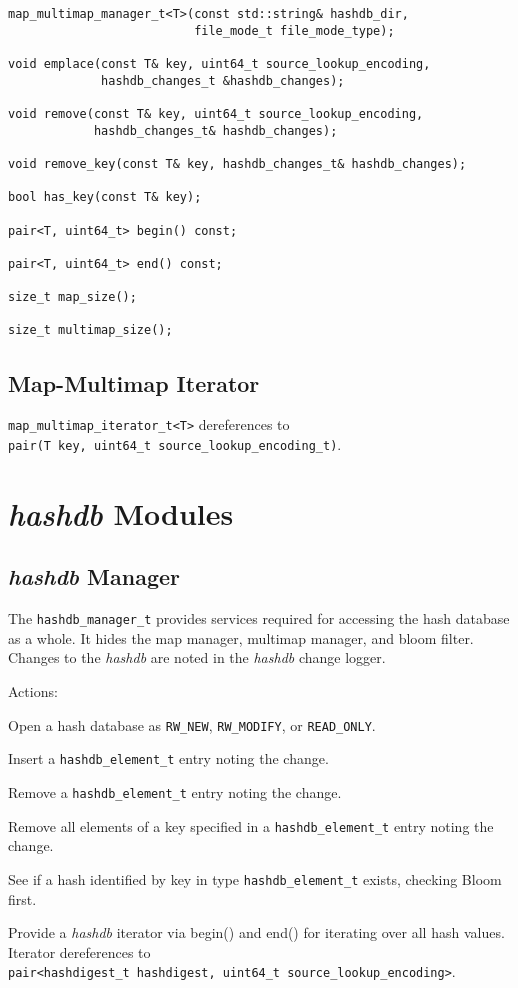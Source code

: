 \documentclass[12pt,twoside]{article}
\newcommand{\hdb}{\emph{hashdb}\xspace}
\begin{document}
\begin{small}
\begin{verbatim}
map_multimap_manager_t<T>(const std::string& hashdb_dir,
                          file_mode_t file_mode_type);

void emplace(const T& key, uint64_t source_lookup_encoding,
             hashdb_changes_t &hashdb_changes);

void remove(const T& key, uint64_t source_lookup_encoding,
            hashdb_changes_t& hashdb_changes);

void remove_key(const T& key, hashdb_changes_t& hashdb_changes);

bool has_key(const T& key);

pair<T, uint64_t> begin() const;

pair<T, uint64_t> end() const;

size_t map_size();

size_t multimap_size();
\end{verbatim}
\end{small}

\subsection{Map-Multimap Iterator}
\texttt{map\_multimap\_iterator\_t<T>} dereferences to \\
\texttt{pair(T key, uint64\_t source\_lookup\_encoding\_t)}.

\section{\hdb Modules}
\subsection{\hdb Manager}
The \texttt{hashdb\_manager\_t}
provides services required for accessing the hash database
as a whole.  It hides the map manager, multimap manager, and bloom filter.
Changes to the \hdb are noted in the \hdb change logger.

Actions:
\begin{compactitem}
\item Open a hash database as
\texttt{RW\_NEW}, \texttt{RW\_MODIFY}, or \texttt{READ\_ONLY}.
\item Insert a \texttt{hashdb\_element\_t} entry noting the change.
\item Remove a \texttt{hashdb\_element\_t} entry noting the change.
\item Remove all elements of a key
specified in a \texttt{hashdb\_element\_t} entry noting the change.
\item See if a hash identified by key in
type \texttt{hashdb\_element\_t} exists, checking Bloom first.
\item Provide a \hdb iterator via begin() and end()
for iterating over all hash values.
Iterator dereferences to \\
\texttt{pair<hashdigest\_t hashdigest, uint64\_t source\_lookup\_encoding>}.
\end{compactitem}
\end{document}
